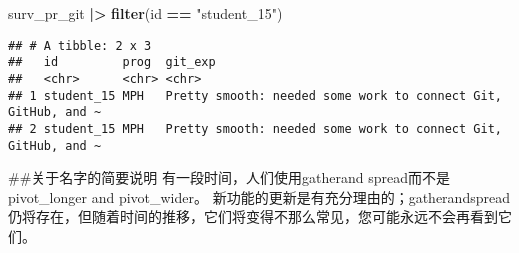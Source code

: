 \documentclass[
]{article}
\newenvironment{Shaded}{\begin{snugshade}}{\end{snugshade}}
\newcommand{\FunctionTok}[1]{\textcolor[rgb]{0.13,0.29,0.53}{\textbf{#1}}}
\newcommand{\NormalTok}[1]{#1}
\newcommand{\SpecialCharTok}[1]{\textcolor[rgb]{0.81,0.36,0.00}{\textbf{#1}}}
\newcommand{\StringTok}[1]{\textcolor[rgb]{0.31,0.60,0.02}{#1}}
\begin{document}
\begin{Shaded}
\begin{Highlighting}[]
\NormalTok{surv\_pr\_git }\SpecialCharTok{|\textgreater{}} \FunctionTok{filter}\NormalTok{(id }\SpecialCharTok{==} \StringTok{"student\_15"}\NormalTok{)}
\end{Highlighting}
\end{Shaded}

\begin{verbatim}
## # A tibble: 2 x 3
##   id         prog  git_exp                                                      
##   <chr>      <chr> <chr>                                                        
## 1 student_15 MPH   Pretty smooth: needed some work to connect Git, GitHub, and ~
## 2 student_15 MPH   Pretty smooth: needed some work to connect Git, GitHub, and ~
\end{verbatim}

\#\#关于名字的简要说明 有一段时间，人们使用gatherand
spread而不是pivot\_longer and pivot\_wider。
新功能的更新是有充分理由的；gatherandspread仍将存在，但随着时间的推移，它们将变得不那么常见，您可能永远不会再看到它们。
\end{document}
